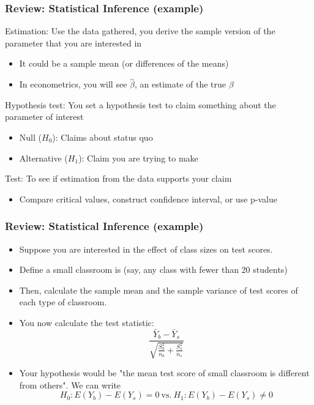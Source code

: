 \documentclass[compress]{beamer}
\newenvironment{wideitemize}{\itemize\addtolength{\itemsep}{10pt}}{\enditemize}
\begin{document}
\begin{frame}
\frametitle{Review: Statistical Inference (example)}
\begin{wideitemize}
\item Estimation: Use the data gathered, you derive the sample version of the parameter that you are interested in
\begin{itemize}
\item It could be a sample mean (or differences of the means)
\item In econometrics, you will see $\hat{\beta}$, an estimate of the true $\beta$
\end{itemize}
\item Hypothesis test: You set a hypothesis test to claim something about the parameter of interest
\begin{itemize}
\item Null ($H_0$): Claims about status quo 
\item Alternative ($H_1$): Claim you are trying to make
\end{itemize}
\item Test: To see if estimation from the data supports your claim
\begin{itemize}
\item Compare critical values, construct confidence interval, or use p-value
\end{itemize}
\end{wideitemize}
\end{frame}

\begin{frame}
\frametitle{Review: Statistical Inference (example)}
\begin{itemize}
\item Suppose you are interested in the effect of class sizes on test scores. 
\item Define a small classroom is (say, any class with fewer than 20 students) 
\item Then, calculate the sample mean and the sample variance of test scores of each type of classroom. 
\item You now calculate the test statistic: 
\[ 
\frac{\bar{Y}_b-\bar{Y}_s}{\sqrt{\frac{S_b^2}{n_b}+\frac{S_s^2}{n_s}}}
\]
\item Your hypothesis would be "the mean test score of small classroom is different from others". We can write
\[
H_0: E(Y_b)-E(Y_s) = 0\ \text{vs.}\ H_1:E(Y_b)-E(Y_s) \neq 0
\]
\end{itemize}
\end{frame}
\end{document}
